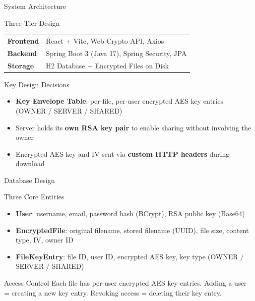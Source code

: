 \documentclass{SKP-beamer}
\begin{document}
\begin{frame}[fragile]{System Architecture}
\begin{block}{Three-Tier Design}
\small
\begin{tabular}{@{}ll@{}}
\textbf{Frontend} & React + Vite, Web Crypto API, Axios \\[0.3em]
\textbf{Backend} & Spring Boot 3 (Java 17), Spring Security, JPA \\[0.3em]
\textbf{Storage} & H2 Database + Encrypted Files on Disk \\
\end{tabular}
\end{block}

\vspace{0.3cm}

\begin{block}{Key Design Decisions}
\begin{itemize}
  \item \textbf{Key Envelope Table}: per-file, per-user encrypted AES key entries (OWNER / SERVER / SHARED)
  \item Server holds its \textbf{own RSA key pair} to enable sharing without involving the owner
  \item Encrypted AES key and IV sent via \textbf{custom HTTP headers} during download
\end{itemize}
\end{block}
\end{frame}

\begin{frame}{Database Design}
\begin{block}{Three Core Entities}
\begin{itemize}
  \item \textbf{User}: username, email, password hash (BCrypt), RSA public key (Base64)
  \item \textbf{EncryptedFile}: original filename, stored filename (UUID), file size, content type, IV, owner ID
  \item \textbf{FileKeyEntry}: file ID, user ID, encrypted AES key, key type (OWNER / SERVER / SHARED)
\end{itemize}
\end{block}

\vspace{0.2cm}
\begin{alertblock}{Access Control}
Each file has per-user encrypted AES key entries. Adding a user = creating a new key entry. Revoking access = deleting their key entry.
\end{alertblock}
\end{frame}
\end{document}
